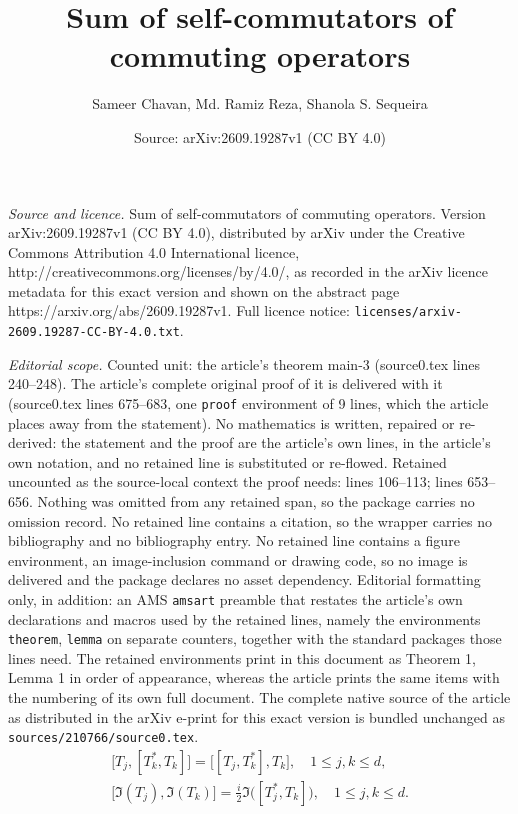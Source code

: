 \documentclass[10pt,a4paper]{amsart}
\title{Sum of self-commutators of commuting operators}
\author{Sameer Chavan, Md. Ramiz Reza, Shanola S. Sequeira}
\date{Source: arXiv:2609.19287v1 (CC BY 4.0)}
\newcommand*{\Le}{\leqslant}
\begin{document}
\maketitle

\noindent\emph{Source and licence.} Sum of self-commutators of commuting operators. Version arXiv:2609.19287v1 (CC BY 4.0), distributed by arXiv under the Creative Commons Attribution 4.0 International licence, http://creativecommons.org/licenses/by/4.0/, as recorded in the arXiv licence metadata for this exact version and shown on the abstract page https://arxiv.org/abs/2609.19287v1. Full licence notice: \texttt{licenses/arxiv-2609.19287-CC-BY-4.0.txt}.\par\smallskip

\noindent\textit{Editorial scope.} Counted unit: the article's theorem main-3 (source0.tex lines 240--248). The article's complete original proof of it is delivered with it (source0.tex lines 675--683, one \texttt{proof} environment of 9 lines, which the article places away from the statement). No mathematics is written, repaired or re-derived: the statement and the proof are the article's own lines, in the article's own notation, and no retained line is substituted or re-flowed.  Retained uncounted as the source-local context the proof needs: lines 106--113; lines 653--656.  Nothing was omitted from any retained span, so the package carries no omission record.  No retained line contains a citation, so the wrapper carries no bibliography and no bibliography entry.  No retained line contains a figure environment, an image-inclusion command or drawing code, so no image is delivered and the package declares no asset dependency.  Editorial formatting only, in addition: an AMS \texttt{amsart} preamble that restates the article's own declarations and macros used by the retained lines, namely the environments \texttt{theorem}, \texttt{lemma} on separate counters, together with the standard packages those lines need.  The retained environments print in this document as Theorem 1, Lemma 1 in order of appearance, whereas the article prints the same items with the numbering of its own full document.  The complete native source of the article as distributed in the arXiv e-print for this exact version is bundled unchanged as \texttt{sources/210766/source0.tex}.
\begin{align}
\label{d-comm-formula}
 \big[T_j, [T^*_k, T_k]\big] = \big[[T_j, T^*_k], T_k\big],
\quad 1 \Le j, k \Le d, \\
\label{d-comm-formula-im}
 \big[\Im (T_j), \Im (T_k)\big] =\frac{i}{2}\Im\big([T^*_j, T_k]\big), 
\quad 1 \Le j, k \Le d.
\end{align}
\end{document}
